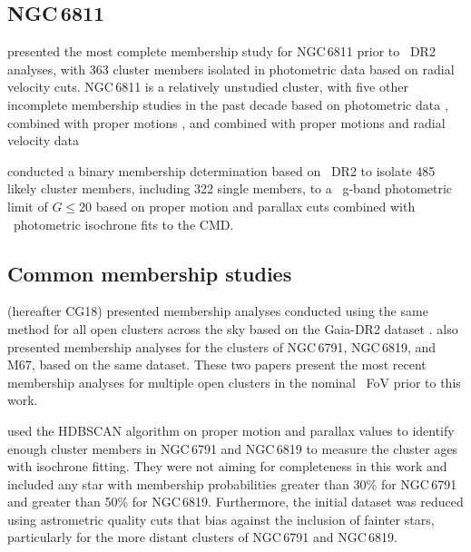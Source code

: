 \subsection{NGC\,6811}

\cite{meibom_kepler_2011} presented the most complete membership study for NGC\,6811 prior to \Gaia~DR2 analyses, with 363 cluster members isolated in photometric data based on radial velocity cuts. NGC\,6811 is a relatively unstudied cluster, with five other incomplete membership studies in the past decade based on photometric data \citep{pena_determination_2011, janes_ngc_2013}, combined with proper motions \citep{kharchenko_astrophysical_2004,kharchenko_integrated_2009}, and combined with proper motions and radial velocity data \citep{frinchaboy_open_2008}

\cite{curtis_temporary_2019} conducted a binary membership determination based on \Gaia~DR2 to isolate 485 likely cluster members, including 322 single members, to a \Gaia~g-band photometric limit of $G\leq20$ based on proper motion and parallax cuts combined with \Gaia~photometric isochrone fits to the CMD.

\subsection{Common membership studies}

\cite{cantat-gaudin_gaia_2018} (hereafter CG18) presented membership analyses conducted using the same method for all open clusters across the sky based on the Gaia-DR2 dataset \citep{gaia_collaboration_gaia_2018-1}. \cite{choi_star_2018} also presented membership analyses for the clusters of NGC\,6791, NGC\,6819, and M67, based on the same dataset. These two papers present the most recent membership analyses for multiple open clusters in the nominal \Kepler~FoV prior to this work.

\cite{choi_star_2018} used the HDBSCAN algorithm on proper motion and parallax values to identify enough cluster members in NGC\,6791 and NGC\,6819 to measure the cluster ages with isochrone fitting. They were not aiming for completeness in this work and included any star with membership probabilities greater than 30\% for NGC\,6791 and greater than  50\% for NGC\,6819. Furthermore, the initial dataset was reduced using astrometric quality cuts that bias against the inclusion of fainter stars, particularly for the more distant clusters of NGC\,6791 and NGC\,6819.

